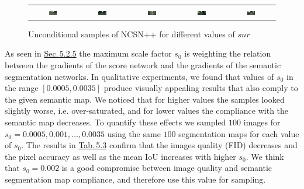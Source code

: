\begin{figure}
\begin{tabular}{ccccc}
        \\
        \includegraphics[width=0.19\textwidth]{Chapters/figures/experiments/cityscapes/snr/0.075/4_uncond_sample.png} & 
        \includegraphics[width=0.19\textwidth]{Chapters/figures/experiments/cityscapes/snr/0.1/9_uncond_sample.png} & 
        \includegraphics[width=0.19\textwidth]{Chapters/figures/experiments/cityscapes/snr/0.125/4_uncond_sample.png} &
        \includegraphics[width=0.19\textwidth]{Chapters/figures/experiments/cityscapes/snr/0.15/17_uncond_sample.png} & \includegraphics[width=0.19\textwidth]{Chapters/figures/experiments/cityscapes/snr/0.175/8_uncond_sample.png}
    \end{tabular}
    \caption{Unconditional samples of NCSN++ for different values of $snr$}
\end{figure}
%

As seen in \hyperref[sec:5.2.5]{Sec.\,5.2.5} the maximum scale factor $s_0$ is weighting the relation between the gradients of the score network and the gradients of the semantic segmentation networks. In qualitative experiments, we found that values of $s_0$ in the range $[0.0005,0.0035]$ produce visually appealing results that also comply to the given semantic map. We noticed that for higher values the samples looked slightly worse, i.e. over-saturated, and for lower values the compliance with the semantic map decreases. To quantify these effects we sampled $100$ images for $s_0=0.0005, 0.001, \dots, 0.0035$ using the same $100$ segmentation maps for each value of $s_0$. The results in \hyperref[tab:5.3]{Tab.\,5.3} confirm that the images quality (FID) decreases and the pixel accuracy as well as the mean IoU increases with higher $s_0$. We think that $s_0=0.002$ is a good compromise between image quality and semantic segmentation map compliance, and therefore use this value for sampling.

